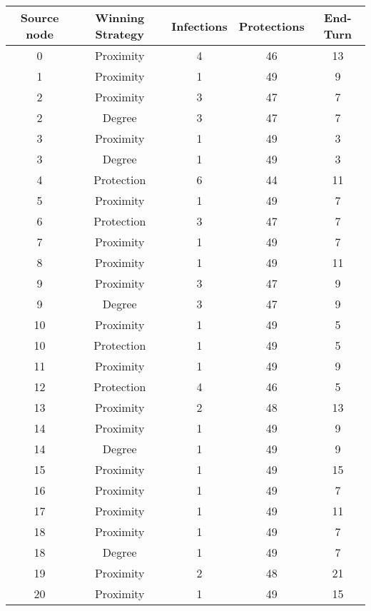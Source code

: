 \documentclass[results.tex]{subfiles}
\begin{document}
\begin{center}
  \begin{tabular}{| c || c | c | c | c |}
    \hline
    {\bfseries Source node} & {\bfseries Winning Strategy} & {\bfseries Infections} & {\bfseries Protections} & {\bfseries End-Turn} \\  %
    \hline\hline
    0 & Proximity & 4 & 46 & 13 \\ 
    \hline
    1 & Proximity & 1 & 49 & 9 \\ 
    \hline
    2 & Proximity & 3 & 47 & 7 \\ 
    \hline
    2 & Degree & 3 & 47 & 7 \\ 
    \hline
    3 & Proximity & 1 & 49 & 3 \\ 
    \hline
    3 & Degree & 1 & 49 & 3 \\ 
    \hline
    4 & Protection & 6 & 44 & 11 \\ 
    \hline
    5 & Proximity & 1 & 49 & 7 \\ 
    \hline
    6 & Protection & 3 & 47 & 7 \\ 
    \hline
    7 & Proximity & 1 & 49 & 7 \\ 
    \hline
    8 & Proximity & 1 & 49 & 11 \\ 
    \hline
    9 & Proximity & 3 & 47 & 9 \\ 
    \hline
    9 & Degree & 3 & 47 & 9 \\ 
    \hline
    10 & Proximity & 1 & 49 & 5 \\ 
    \hline
    10 & Protection & 1 & 49 & 5 \\ 
    \hline
    11 & Proximity & 1 & 49 & 9 \\ 
    \hline
    12 & Protection & 4 & 46 & 5 \\ 
    \hline
    13 & Proximity & 2 & 48 & 13 \\ 
    \hline
    14 & Proximity & 1 & 49 & 9 \\ 
    \hline
    14 & Degree & 1 & 49 & 9 \\ 
    \hline
    15 & Proximity & 1 & 49 & 15 \\ 
    \hline
    16 & Proximity & 1 & 49 & 7 \\ 
    \hline
    17 & Proximity & 1 & 49 & 11 \\ 
    \hline
    18 & Proximity & 1 & 49 & 7 \\ 
    \hline
    18 & Degree & 1 & 49 & 7 \\ 
    \hline
    19 & Proximity & 2 & 48 & 21 \\ 
    \hline
    20 & Proximity & 1 & 49 & 15 \\ 

\end{tabular}
\end{center}
\end{document}
